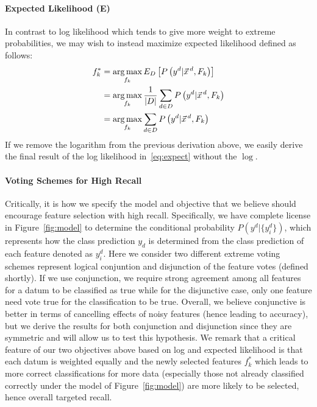 \paragraph{Expected Likelihood (E)}

In contrast to log likelihood which tends to give more weight to extreme
probabilities, we may wish to instead maximize expected likelihood
defined as follows:
\begin{align*}
f_k^*&=\argmax_{f_k}E_D\left[P\left(y^d|\vec{x}^{\,d},F_k\right)\right]\nonumber\\
&=\argmax_{f_k}\frac{1}{|D|}\sum_{d\in D} P\left(y^d | \vec{x}^{\,d},F_k\right)\nonumber\\
&=\argmax_{f_k} \sum_{d\in D} P\left(y^d | \vec{x}^{\,d},F_k\right)\nonumber\\
\end{align*}
If we remove the logarithm from the previous derivation above, we easily
derive the final result of the log likelihood in~\eqref{eq:expect} without the $\log$.


\paragraph{Voting Schemes for High Recall}

Critically, it is how we specify the model and objective that we
believe should encourage feature selection with high recall.
Specifically, we have complete license in Figure~\ref{fig:model} to
determine the conditional probability $P(y^d|\{y^d_i\})$, which
represents how the class prediction $y_d$ is determined from the class
prediction of each feature denoted as $y^d_i$.  Here we consider two
different extreme voting schemes represent logical conjuntion and
disjunction of the feature votes (defined shortly).  If we use
conjunction, we require strong agreement among all features for a
datum to be classified as true while for the disjunctive case, only
one feature need vote true for the classification to be true.
Overall, we believe conjunctive is better in terms of cancelling
effects of noisy features (hence leading to accuracy), but we derive
the results for both conjunction and disjunction since they are
symmetric and will allow us to test this hypothesis.  We remark that a
critical feature of our two objectives above based on log and expected
likelihood is that each datum is weighted equally and the newly
selected features $f_k^*$ which leads to more correct classifications
for more data (especially those not already classified correctly under
the model of Figure~\ref{fig:model}) are more likely to be selected,
hence overall targeted recall.

